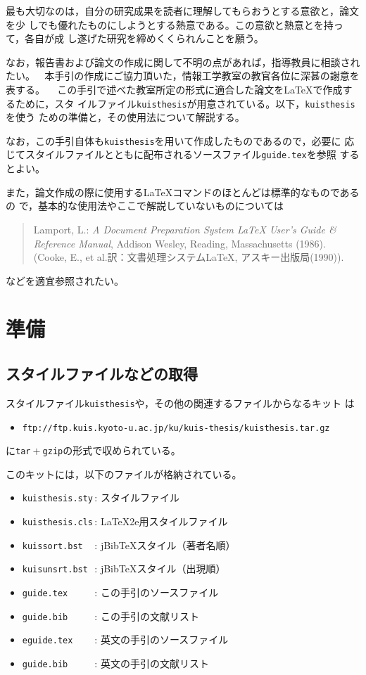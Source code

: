 \documentclass{kuisthesis}			%
\def\LATEXe{\ifx\LaTeXe\undefined \LaTeX 2e\else\LaTeXe\fi}
\def\|{\verb|}
\begin{document}
最も大切なのは，自分の研究成果を読者に理解してもらおうとする意欲と，論文を少
しでも優れたものにしようとする熱意である。この意欲と熱意とを持って，各自が成
し遂げた研究を締めくくられんことを願う。

なお，報告書および論文の作成に関して不明の点があれば，指導教員に相談されたい。

\acknowledgments				% 謝辞
本手引の作成にご協力頂いた，情報工学教室の教官各位に深甚の謝意を表する。

\nocite{*}
			% 文献スタイルの指定
				% 参考文献の出力

						% 付録の開始
この手引で述べた教室所定の形式に適合した論文を\LaTeX で作成するために，スタ
イルファイル\|kuisthesis|が用意されている。以下，\|kuisthesis|を使う
ための準備と，その使用法について解説する。

なお，この手引自体も\|kuisthesis|を用いて作成したものであるので，必要に
応じてスタイルファイルとともに配布されるソースファイル\|guide.tex|を参照
するとよい。

また，論文作成の際に使用する\LaTeX コマンドのほとんどは標準的なものであるの
で，基本的な使用法やここで解説していないものについては
\begin{quote}%
Lamport, L.: {\em A Document Preparation System {\LaTeX} User's Guide \&
Reference Manual\/}, Addison Wesley, Reading, Massachusetts (1986).
(Cooke, E., et al.訳：文書処理システム{\LaTeX}, アスキー出版局(1990)).
\end{quote}%
などを適宜参照されたい。

\section{準備}\label{app-prelim}
\subsection{スタイルファイルなどの取得}\label{appsub-kit}
スタイルファイル\|kuisthesis|や，その他の関連するファイルからなるキット
は
\begin{itemize}\item[]\small%
\|ftp://ftp.kuis.kyoto-u.ac.jp/ku/kuis-thesis/kuisthesis.tar.gz|
\end{itemize}%
に\|tar|${}+{}$\|gzip|の形式で収められている。

このキットには，以下のファイルが格納されている。
\begin{itemize}%
\item
\|kuisthesis.sty|\,:
スタイルファイル
\item
\|kuisthesis.cls|\,:
{\LATEXe}用スタイルファイル
\item
\|kuissort.bst  |\,:
jBib\TeX スタイル（著者名順）
\item
\|kuisunsrt.bst |\,:
jBib\TeX スタイル（出現順）
\item
\|guide.tex     |\,:
この手引のソースファイル
\item
\|guide.bib     |\,:
この手引の文献リスト
\item
\|eguide.tex    |\,:
英文の手引のソースファイル
\item
\|guide.bib     |\,:
英文の手引の文献リスト
\end{itemize}%

\end{document}

